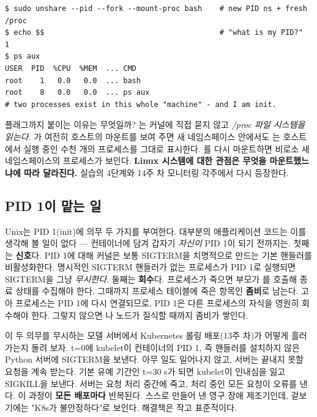 \begin{terminalbox}
\begin{Verbatim}[breaklines=true,breakanywhere=true,fontsize=\small,formatcom=\color{tbbtermfg},codes=\tbbcodeactive]
$ sudo unshare --pid --fork --mount-proc bash    # new PID ns + fresh /proc
$ echo $$                                        # "what is my PID?"
1
$ ps aux
USER  PID  %CPU  %MEM  ... CMD
root    1   0.0   0.0  ... bash
root    8   0.0   0.0  ... ps aux
# two processes exist in this whole "machine" - and I am init.
\end{Verbatim}
\end{terminalbox}

 플래그까지 붙이는 이유는 무엇일까? 는 커널에 직접 묻지 않고 \textit{/proc 파일 시스템을 읽는다}. 가 여전히 호스트의 마운트를 보여 주면 새 네임스페이스 안에서도 는 호스트에서 실행 중인 수천 개의 프로세스를 그대로 표시한다. 를 다시 마운트하면 비로소 새 네임스페이스의 프로세스가 보인다. \textbf{Linux 시스템에 대한 관점은 무엇을 마운트했느냐에 따라 달라진다.} 실습의 4단계와 14주 차 모니터링 각주에서 다시 등장한다.

\subsection*{PID 1이 맡는 일}

Unix는 PID 1(init)에 의무 두 가지를 부여한다. 대부분의 애플리케이션 코드는 이를 생각해 볼 일이 없다 — 컨테이너에 담겨 갑자기 \textit{자신이} PID 1이 되기 전까지는. 첫째는 \textbf{신호}다. PID 1에 대해 커널은 보통 SIGTERM을 치명적으로 만드는 기본 핸들러를 비활성화한다. 명시적인 SIGTERM 핸들러가 없는 프로세스가 PID 1로 실행되면 SIGTERM을 그냥 \textit{무시한다}. 둘째는 \textbf{회수}다. 프로세스가 죽으면 부모가 를 호출해 종료 상태를 수집해야 한다. 그때까지 프로세스 테이블에 죽은 항목인 \textbf{좀비}로 남는다. 고아 프로세스는 PID 1에 다시 연결되므로, PID 1은 다른 프로세스의 자식을 영원히 회수해야 한다. 그렇지 않으면 나 노드가 질식할 때까지 좀비가 쌓인다.

이 두 의무를 무시하는 모델 서버에서 Kubernetes 롤링 배포(13주 차)가 어떻게 흘러가는지 돌려 보자. t=0에 kubelet이 컨테이너의 PID 1, 즉 핸들러를 설치하지 않은 Python 서버에 SIGTERM을 보낸다. 아무 일도 일어나지 않고, 서버는 끝내지 못할 요청을 계속 받는다. 기본 유예 기간인 t=30 s가 되면 kubelet이 인내심을 잃고 SIGKILL을 보낸다. 서버는 요청 처리 중간에 죽고, 처리 중인 모든 요청이 오류를 낸다. 이 과정이 \textbf{모든 배포마다} 반복된다. 스스로 만들어 낸 영구 장애 제조기인데, 겉보기에는 "K8s가 불안정하다"로 보인다. 해결책은 작고 표준적이다.


